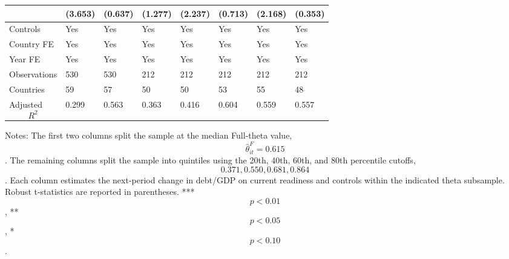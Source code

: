 \begin{table}[H]
\begin{threeparttable}
\begin{tabularx}{\textwidth}{lYYYYYYY}
  & (3.653) & (0.637) & (1.277) & (2.237) & (0.713) & (2.168) & (0.353) \\
\midrule
Controls & Yes & Yes & Yes & Yes & Yes & Yes & Yes \\
Country FE & Yes & Yes & Yes & Yes & Yes & Yes & Yes \\
Year FE & Yes & Yes & Yes & Yes & Yes & Yes & Yes \\
Observations & 530 & 530 & 212 & 212 & 212 & 212 & 212 \\
Countries & 59 & 57 & 50 & 50 & 53 & 55 & 48 \\
Adjusted $$R^2$$ & 0.299 & 0.563 & 0.363 & 0.416 & 0.604 & 0.559 & 0.557 \\
\bottomrule
\end{tabularx}
\begin{tablenotes}[flushleft]\footnotesize
\item Notes: The first two columns split the sample at the median Full-theta value, $$\widehat{\theta}^{F}_{it}=0.615$$. The remaining columns split the sample into quintiles using the 20th, 40th, 60th, and 80th percentile cutoffs, $$0.371, 0.550, 0.681, 0.864$$. Each column estimates the next-period change in debt/GDP on current readiness and controls within the indicated theta subsample. Robust t-statistics are reported in parentheses. *** $$p<0.01$$, ** $$p<0.05$$, * $$p<0.10$$.
\end{tablenotes}
\end{threeparttable}
\end{table}
